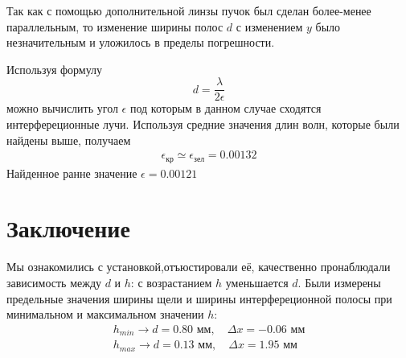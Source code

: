 Так как с помощью дополнительной линзы пучок был сделан более-менее параллельным, то изменение ширины полос $d$ с изменением $y$ было незначительным и уложилось в пределы погрешности.

Используя формулу 
\begin{equation}
	d=\frac{\lambda}{2\epsilon}	
\end{equation}
можно вычислить угол $\epsilon$ под которым в данном случае сходятся интерфереционные лучи. Используя средние значения длин волн, которые были найдены выше, получаем
\begin{gather*}
	\epsilon_{\text{кр}}\simeq\epsilon_{\text{зел}}=0.00132
\end{gather*}
 Найденное ранне значение $\epsilon=0.00121$

\section{Заключение}
Мы ознакомились с установкой,отъюстировали её, качественно пронаблюдали зависимость между $d$ и $h$: с возрастанием $h$ уменьшается $d$. Были измерены предельные значения ширины щели и ширины интерфереционной полосы при минимальном и максимальном значении $h$: 
\begin{gather*}
h_{min}\to d=0.80\text{ мм}, \quad \Delta x=-0.06\text{ мм}\\
h_{max}\to d=0.13\text{ мм}, \quad \Delta x=1.95\text{ мм} 	
\end{gather*}
   
 